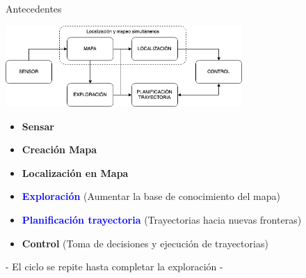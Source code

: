 \documentclass[24pt,aspectratio=169]{beamer}
\begin{document}
\begin{frame}{Antecedentes}

  \centering
  \bigskip %
  \includegraphics[width=9cm]{exploracion}\\
  
  \begin{itemize}
  \item \textbf{Sensar}
  \item \textbf{Creación Mapa} 
  \item \textbf{Localización en Mapa}
  \item \textbf{\textcolor{blue}{Exploración}} (Aumentar la base de conocimiento del mapa)
  \item \textbf{\textcolor{blue}{Planificación trayectoria}} (Trayectorias hacia nuevas fronteras) 
  \item \textbf{Control} (Toma de decisiones y ejecución de trayectorias)
  \end{itemize}
  
  \alert{- El ciclo se repite hasta completar la exploración -}

\end{frame}
\end{document}
